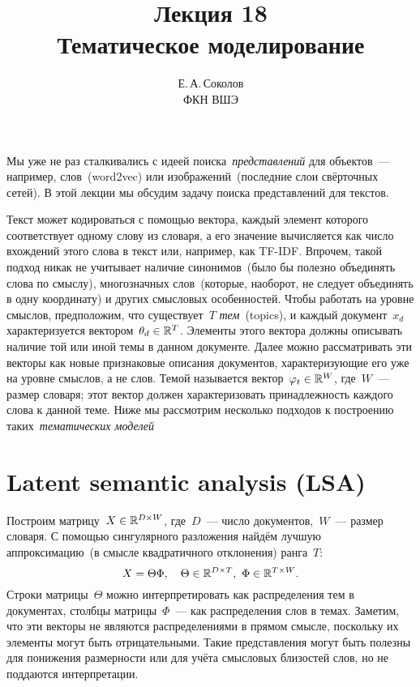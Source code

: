 \documentclass[12pt,fleqn]{article}
\begin{document}
\title{Лекция 18\\Тематическое моделирование}
\author{Е.\,А.\,Соколов\\ФКН ВШЭ}
\maketitle

Мы уже не раз сталкивались с идеей поиска~\emph{представлений} для объектов~---
например, слов~(word2vec) или изображений~(последние слои свёрточных сетей).
В этой лекции мы обсудим задачу поиска представлений для текстов.

Текст может кодироваться с помощью вектора, каждый элемент которого соответствует одному слову из словаря,
а его значение вычисляется как число вхождений этого слова в текст или, например, как TF-IDF.
Впрочем, такой подход никак не учитывает наличие синонимов~(было бы полезно объединять слова по смыслу),
многозначных слов~(которые, наоборот, не следует объединять в одну координату)
и других смысловых особенностей.
Чтобы работать на уровне смыслов, предположим, что существует~$T$ \emph{тем}~(topics),
и каждый документ~$x_d$ характеризуется вектором~$\theta_d \in \mathbb{R}^T$.
Элементы этого вектора должны описывать наличие той или иной темы в данном документе.
Далее можно рассматривать эти векторы как новые признаковые описания документов,
характеризующие его уже на уровне смыслов, а не слов.
Темой называется вектор~$\varphi_t \in \mathbb{R}^W$, где~$W$~--- размер словаря;
этот вектор должен характеризовать принадлежность каждого слова к данной теме.
Ниже мы рассмотрим несколько подходов к построению таких~\emph{тематических моделей}

\section{Latent semantic analysis (LSA)}

Построим матрицу~$X \in \RR^{D \times W}$, где~$D$~--- число документов,~$W$~--- размер словаря.
С помощью сингулярного разложения найдём лучшую аппроксимацию~(в смысле квадратичного отклонения)
ранга~$T$:
\[
    X
    =
    \Theta \Phi,
    \quad
    \Theta \in \RR^{D \times T},\ 
    \Phi \in \RR^{T \times W}.
\]
Строки матрицы~$\Theta$ можно интерпретировать как распределения тем в документах,
столбцы матрицы~$\Phi$~--- как распределения слов в темах.
Заметим, что эти векторы не являются распределениями в прямом смысле, поскольку
их элементы могут быть отрицательными.
Такие представления могут быть полезны для понижения размерности или для учёта
смысловых близостей слов, но не поддаются интерпретации.
\end{document}

